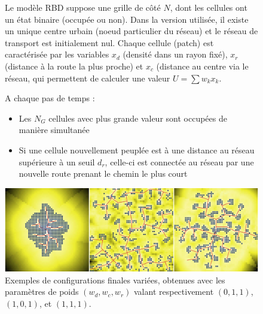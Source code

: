 \begin{figure}[h!]
\begin{mdframed}
Le modèle RBD suppose une grille de côté $N$, dont les cellules ont un état binaire (occupée ou non). Dans la version utilisée, il existe un unique centre urbain (noeud particulier du réseau) et le réseau de transport est initialement nul. Chaque cellule (patch) est caractérisée par les variables $x_d$ (densité dans un rayon fixé), $x_r$ (distance à la route la plus proche) et $x_c$ (distance au centre via le réseau, qui permettent de calculer une valeur $U = \sum w_k x_k$.

A chaque pas de temps :
\begin{itemize}
	\item Les $N_G$ cellules avec plus grande valeur sont occupées de manière simultanée
	\item Si une cellule nouvellement peuplée est à une distance au réseau supérieure à un seuil $d_r$, celle-ci est connectée au réseau par une nouvelle route prenant le chemin le plus court
\end{itemize}

\includegraphics[width=\linewidth]{Figures/Final/4-2-2-frame-causalityregimes-rdb.jpg}
 Exemples de configurations finales variées, obtenues avec les paramètres de poids $(w_{d},w_{c},w_{r})$ valant respectivement $(0,1,1)$,$(1,0,1)$, et $(1,1,1)$.

\medskip

\end{mdframed}
\end{figure}





